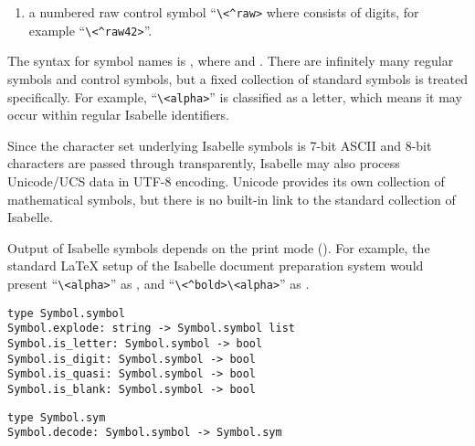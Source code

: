 \begin{isabellebody}
\begin{isamarkuptext}
\begin{enumerate}
  \item a numbered raw control symbol ``\verb,\,\verb,<^raw,\verb,>, where  consists of digits, for example
  ``\verb,\,\verb,<^raw42>,''.

  \end{enumerate}

  \noindent The  syntax for symbol names is , where  and .  There are infinitely many
  regular symbols and control symbols, but a fixed collection of
  standard symbols is treated specifically.  For example,
  ``\verb,\,\verb,<alpha>,'' is classified as a letter, which means it
  may occur within regular Isabelle identifiers.

  Since the character set underlying Isabelle symbols is 7-bit ASCII
  and 8-bit characters are passed through transparently, Isabelle may
  also process Unicode/UCS data in UTF-8 encoding.  Unicode provides
  its own collection of mathematical symbols, but there is no built-in
  link to the standard collection of Isabelle.

  \medskip Output of Isabelle symbols depends on the print mode
  ().  For example, the standard {\LaTeX} setup of the
  Isabelle document preparation system would present
  ``\verb,\,\verb,<alpha>,'' as \isa{{\isasymalpha}}, and
  ``\verb,\,\verb,<^bold>,\verb,\,\verb,<alpha>,'' as \isa{\isactrlbold {\isasymalpha}}.%
\end{isamarkuptext}%
\isamarkuptrue%
%
\isadelimmlref
%
\endisadelimmlref
%
\isatagmlref
%
\begin{isamarkuptext}%
\begin{mldecls}
  \verb|type Symbol.symbol| \\
  \verb|Symbol.explode: string -> Symbol.symbol list| \\
  \verb|Symbol.is_letter: Symbol.symbol -> bool| \\
  \verb|Symbol.is_digit: Symbol.symbol -> bool| \\
  \verb|Symbol.is_quasi: Symbol.symbol -> bool| \\
  \verb|Symbol.is_blank: Symbol.symbol -> bool| \\
  \end{mldecls}
  \begin{mldecls}
  \verb|type Symbol.sym| \\
  \verb|Symbol.decode: Symbol.symbol -> Symbol.sym| \\
  \end{mldecls}


\end{isamarkuptext}
\end{isabellebody}
